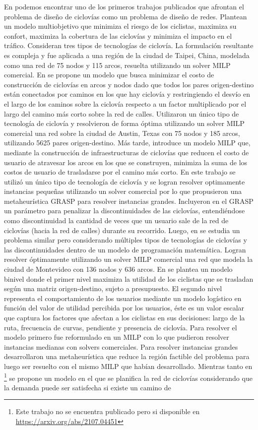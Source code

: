   En \cite{Lin2013} podemos encontrar uno de los primeros trabajos publicados que afrontan el problema de diseño de ciclovías como un problema de diseño de redes. Plantean un modelo multiobjetivo que minimiza el riesgo de los ciclistas, maximiza su confort, maximiza la cobertura de las ciclovías y minimiza el impacto en el tráfico. Consideran tres tipos de tecnologías de ciclovía. La formulación resultante es compleja y fue aplicada a una región de la ciudad de Taipei, China, modelada como una red de 75 nodos y 115 arcos, resuelta utilizando un solver MILP comercial. En \cite{Duthie2014} se propone un modelo que busca minimizar el costo de construcción de ciclovías en arcos y nodos dado que todos los pares origen-destino están conectados por caminos en los que hay ciclovía y restringiendo el desvío en el largo de los caminos sobre la ciclovía respecto a un factor multiplicado por el largo del camino más corto sobre la red de calles. Utilizaron un único tipo de tecnología de ciclovía y resolvieron de forma óptima utilizando un solver MILP comercial una red sobre la ciudad de Austin, Texas con 75 nodos y 185 arcos, utilizando 5625 pares origen-destino. Más tarde, \cite{Mauttone2017} introduce un modelo MILP que, mediante la construcción de infraestructuras de ciclovías que reducen el costo de usuario de atravesar los arcos en los que se construyen, minimiza la suma de los costos de usuario de trasladarse por el camino más corto. En este trabajo se utilizó un único tipo de tecnología de ciclovía y se logran resolver optimamente instancias pequeñas utilizando un solver comercial por lo que propusieron una metaheurística GRASP para resolver instancias grandes. Incluyeron en el GRASP un parámetro para penalizar la discontinuidades de las ciclovías, entendiéndose como discontinuidad la cantidad de veces que un usuario sale de la red de ciclovías (hacia la red de calles) durante su recorrido. Luego, en \cite{baya2021} se estudia un problema similar pero considerando múltiples tipos de tecnologías de ciclovías y las discontinuidades dentro de un modelo de programación matemática. Logran resolver óptimamente utilizando un solver MILP comercial una red que modela la ciudad de Montevideo con 136 nodos y 636 arcos. En \cite{Liu2019} se plantea un modelo binivel donde el primer nivel maximiza la utilidad de los ciclistas que se trasladan según una matriz origen-destino, sujeto a presupuesto. El segundo nivel representa el comportamiento de los usuarios mediante un modelo logístico en función del valor de utilidad percibida por los usuarios, éste es un valor escalar que captura los factores que afectan a los ciclistas en sus decisiones: largo de la ruta, frecuencia de curvas, pendiente y presencia de ciclovía. Para resolver el modelo primero fue reformulado en un MILP con lo que pudieron resolver instancias medianas con solvers comerciales. Para resolver instancias grandes desarrollaron una metaheurística que reduce la región factible del problema para luego ser resuelto con el mismo MILP que habían desarrollado. Mientras tanto en \cite{lim2021}\footnote{Este trabajo no se encuentra publicado pero si disponible en \url{https://arxiv.org/abs/2107.04451}} se propone un modelo en el que se planifica la red de ciclovías considerando que la demanda puede ser satisfecha si existe un camino de 